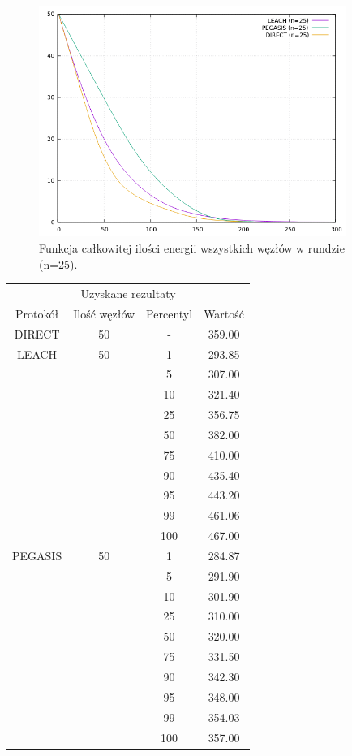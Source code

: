 \documentclass[a4paper,12pt,twoside,openany]{report}
\begin{document}
\begin{figure}[H]
 \centering
 \includegraphics[width=10cm]{images/gnuplot/test_2/energy_in_round_25.png}
 \caption{Funkcja całkowitej ilości energii wszystkich węzłów w rundzie (n=25).}
\end{figure}

\begin{longtable}{*{4}{c}}
\toprule
\multicolumn{4}{c}{Uzyskane rezultaty} \\
Protokół	& Ilość węzłów	& Percentyl	& Wartość \\
\midrule
\endhead
DIRECT	& 50 	& -	& 359.00 \\*
\midrule
LEACH	& 50	& 1	& 293.85 \\*
	&	& 5	& 307.00 \\*
	&	& 10	& 321.40 \\*
	&	& 25	& 356.75 \\*
	&	& 50	& 382.00 \\*
	&	& 75	& 410.00 \\*
	&	& 90	& 435.40 \\*
	&	& 95	& 443.20 \\*
	&	& 99	& 461.06 \\*
	&	& 100	& 467.00 \\*
\midrule
PEGASIS	& 50	& 1	& 284.87 \\*
	&	& 5	& 291.90 \\*
	&	& 10	& 301.90 \\*
	&	& 25	& 310.00 \\*
	&	& 50	& 320.00 \\*
	&	& 75	& 331.50 \\*
	&	& 90	& 342.30 \\*
	&	& 95	& 348.00 \\*
	&	& 99	& 354.03 \\*
	&	& 100	& 357.00 \\*
\bottomrule
\end{longtable}
\end{document}
